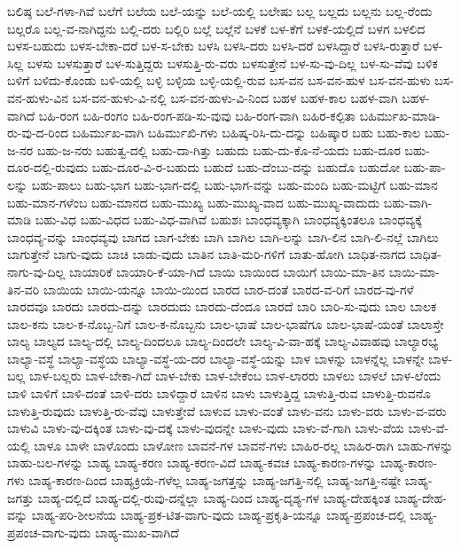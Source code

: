 {ಬಲಿಷ್ಠ
ಬಲೆ-ಗಳಾ-ಗಿವೆ
ಬಲೆಗೆ
ಬಲೆಯ
ಬಲೆ-ಯನ್ನು
ಬಲೆ-ಯಲ್ಲಿ
ಬಲೇಷು
ಬಲ್ಲ
ಬಲ್ಲದು
ಬಲ್ಲನು
ಬಲ್ಲ-ರೆಂದು
ಬಲ್ಲರೊ
ಬಲ್ಲ-ವ-ನಾಗಿದ್ದನು
ಬಲ್ಲಿ-ದರು
ಬಲ್ಲಿರಿ
ಬಲ್ಲೆ
ಬಲ್ಲೆನೆ
ಬಳಕೆ
ಬಳ-ಕೆಗೆ
ಬಳಕೆ-ಯಲ್ಲಿದೆ
ಬಳಗ
ಬಳಲಿದ
ಬಳಸ-ಬಹುದು
ಬಳಸ-ಬೇಕಾ-ದರೆ
ಬಳ-ಸ-ಬೇಕು
ಬಳಸಿ
ಬಳಸಿ-ದರು
ಬಳಸಿ-ದರೆ
ಬಳಸಿದ್ದಾರೆ
ಬಳಸಿ-ರುತ್ತಾರೆ
ಬಳ-ಸಿಲ್ಲ
ಬಳಸು
ಬಳಸುತ್ತಾರೆ
ಬಳ-ಸುತ್ತಿದ್ದರು
ಬಳಸುತ್ತಿ-ರು-ವರು
ಬಳಸುತ್ತೇನೆ
ಬಳ-ಸು-ವು-ದಿಲ್ಲ
ಬಳ-ಸು-ವೆವು
ಬಳಿಕ
ಬಳಿಗೆ
ಬಳಿದು-ಕೊಂಡು
ಬಳಿ-ಯಲ್ಲಿ
ಬಳ್ಳಿ
ಬಳ್ಳಿಯ
ಬಳ್ಳಿ-ಯಲ್ಲಿ-ರುವ
ಬಸ-ವನ
ಬಸ-ವನ-ಹುಳ
ಬಸ-ವನ-ಹುಳು
ಬಸ-ವನ-ಹುಳು-ವಿನ
ಬಸ-ವನ-ಹುಳು-ವಿ-ನಲ್ಲಿ
ಬಸ-ವನ-ಹುಳು-ವಿ-ನಿಂದ
ಬಹಳ
ಬಹಳ-ಕಾಲ
ಬಹಳ-ವಾಗಿ
ಬಹಳ-ವಾಗಿದೆ
ಬಹಿ-ರಂಗ
ಬಹಿ-ರಂಗಂ
ಬಹಿ-ರಂಗ-ಪಡಿ-ಸು-ವುವು
ಬಹಿ-ರಂಗ-ವಾಗಿ
ಬಹಿರ-ಕಲ್ಪಿತಾ
ಬಹಿರ್ಮುಖ-ಮಾಡಿ-ರು-ವು-ದ-ರಿಂದ
ಬಹಿರ್ಮುಖ-ವಾಗಿ
ಬಹಿರ್ಮುಖಿ-ಗಳು
ಬಹಿಷ್ಕ-ರಿಸಿ-ದು-ದನ್ನು
ಬಹಿಷ್ಕಾರ
ಬಹು
ಬಹು-ಕಾಲ
ಬಹು-ಜ-ನರ
ಬಹು-ಜ-ನರು
ಬಹುತ್ವ-ದಲ್ಲಿ
ಬಹು-ದಾ-ಗಿತ್ತು
ಬಹುದು
ಬಹು-ದು-ಕೊ-ನೆ-ಯದು
ಬಹು-ದೂರ
ಬಹು-ದೂರ-ದಲ್ಲಿ-ರುವುದು
ಬಹು-ದೂರ-ವಿ-ರ-ಬಹುದು
ಬಹುದೆ
ಬಹು-ದೆಂಬು-ದನ್ನು
ಬಹುದೊ
ಬಹುದೋ
ಬಹು-ಪಾ-ಲನ್ನು
ಬಹು-ಪಾಲು
ಬಹು-ಭಾಗ
ಬಹು-ಭಾಗ-ದಲ್ಲಿ
ಬಹು-ಭಾಗ-ವನ್ನು
ಬಹು-ಮಂದಿ
ಬಹು-ಮಟ್ಟಿಗೆ
ಬಹು-ಮಾನ
ಬಹು-ಮಾನ-ಗಳೆಂಬ
ಬಹು-ಮಾನದ
ಬಹು-ಮುಖ್ಯ
ಬಹು-ಮುಖ್ಯ-ವಾದ
ಬಹು-ಮುಖ್ಯ-ವಾದುದು
ಬಹು-ವಾಗಿ-ಮಾಡಿ
ಬಹು-ವಿಧ
ಬಹು-ವಿಧದ
ಬಹು-ವಿಧ-ವಾಗಿವೆ
ಬಹುಶಃ
ಬಾಂಧವ್ಯಕ್ಕಾಗಿ
ಬಾಂಧವ್ಯಕ್ಕಿಂತಲೂ
ಬಾಂಧವ್ಯಕ್ಕೆ
ಬಾಂಧವ್ಯ-ವನ್ನು
ಬಾಂಧವ್ಯವು
ಬಾಗದ
ಬಾಗ-ಬೇಕು
ಬಾಗಿ
ಬಾಗಿಲ
ಬಾಗಿ-ಲನ್ನು
ಬಾಗಿ-ಲಿನ
ಬಾಗಿ-ಲಿ-ನಲ್ಲೆ
ಬಾಗಿಲು
ಬಾಗುತ್ತೇನೆ
ಬಾಗು-ವುದು
ಬಾಚಿ
ಬಾಡು-ವುದು
ಬಾತಿನ
ಬಾತಿ-ಮರಿ-ಗಳಿಗೆ
ಬಾತು-ಹೋಗಿ
ಬಾಧಿತ-ನಾಗದ
ಬಾಧಿತ-ನಾಗು-ವು-ದಿಲ್ಲ
ಬಾಯಾರಿಕೆ
ಬಾಯಾರಿ-ಕೆ-ಯಾ-ಗಿದೆ
ಬಾಯಿ
ಬಾಯಿಂದ
ಬಾಯಿಗೆ
ಬಾಯಿ-ಮಾ-ತಿನ
ಬಾಯಿ-ಮಾ-ತಿನ-ವರಿ
ಬಾಯಿಯ
ಬಾಯಿ-ಯನ್ನೂ
ಬಾಯಿ-ಯಿಂದ
ಬಾರದ
ಬಾರ-ದಂತೆ
ಬಾರದ-ವ-ರಿಗೆ
ಬಾರದ-ವು-ಗಳೆ
ಬಾರದವೂ
ಬಾರದು
ಬಾರದು-ದನ್ನು
ಬಾರದುದು
ಬಾರದು-ದೆಂದೂ
ಬಾರದೆ
ಬಾರಿ
ಬಾರಿ-ಸು-ವುದು
ಬಾಲ
ಬಾಲಕ
ಬಾಲ-ಕನು
ಬಾಲ-ಕ-ನೊಬ್ಬ-ನಿಗೆ
ಬಾಲ-ಕ-ನೊಬ್ಬನು
ಬಾಲ-ಭಾಷೆ
ಬಾಲ-ಭಾಷೆಗೂ
ಬಾಲ-ಭಾಷೆ-ಯಂತೆ
ಬಾಲಾಸ್ತೇ
ಬಾಲ್ಯ
ಬಾಲ್ಯದ
ಬಾಲ್ಯ-ದಲ್ಲಿ
ಬಾಲ್ಯ-ದಿಂದಲೂ
ಬಾಲ್ಯ-ದಿಂದಲೇ
ಬಾಲ್ಯ-ವಿ-ವಾ-ಹಕ್ಕೆ
ಬಾಲ್ಯ-ವಿವಾಹವು
ಬಾಲ್ಯಾರಭ್ಯ
ಬಾಲ್ಯಾ-ವಸ್ಥೆ
ಬಾಲ್ಯಾ-ವಸ್ಥೆಯ
ಬಾಲ್ಯಾ-ವಸ್ಥೆ-ಯ-ದರ
ಬಾಲ್ಯಾ-ವಸ್ಥೆ-ಯನ್ನು
ಬಾಳ
ಬಾಳನ್ನು
ಬಾಳನ್ನೆಲ್ಲ
ಬಾಳನ್ನೇ
ಬಾಳ-ಬಲ್ಲ
ಬಾಳ-ಬಲ್ಲರು
ಬಾಳ-ಬೇಕಾ-ಗಿದೆ
ಬಾಳ-ಬೇಕು
ಬಾಳ-ಬೇಕೆಂಬ
ಬಾಳ-ಲಾರರು
ಬಾಳಲು
ಬಾಳಲೆ
ಬಾಳ-ಲೆಂದು
ಬಾಳಿ
ಬಾಳಿಗೆ
ಬಾಳಿ-ದಂತೆ
ಬಾಳಿ-ದರು
ಬಾಳಿದ್ದಾರೆ
ಬಾಳಿನ
ಬಾಳು
ಬಾಳುತ್ತಿದ್ದ
ಬಾಳುತ್ತಿ-ರುವ
ಬಾಳುತ್ತಿ-ರುವನೊ
ಬಾಳುತ್ತಿ-ರುವುದು
ಬಾಳುತ್ತಿ-ರು-ವೆವು
ಬಾಳುತ್ತೇವೆ
ಬಾಳುವ
ಬಾಳು-ವಂತೆ
ಬಾಳು-ವನು
ಬಾಳು-ವರು
ಬಾಳು-ವ-ವರು
ಬಾಳುವಿ
ಬಾಳು-ವು-ದಕ್ಕಿಂತ
ಬಾಳು-ವು-ದಕ್ಕೆ
ಬಾಳು-ವುದನ್ನೇ
ಬಾಳು-ವುದು
ಬಾಳು-ವೆ-ಗಾಗಿ
ಬಾಳು-ವೆಯ
ಬಾಳು-ವೆ-ಯಲ್ಲಿ
ಬಾಳೂ
ಬಾಳೇ
ಬಾಳೊಂದು
ಬಾಳೋಣ
ಬಾವನೆ-ಗಳ
ಬಾವನೆ-ಗಳು
ಬಾಹಿರ-ರಲ್ಲ
ಬಾಹಿರ-ರಾಗಿ
ಬಾಹು-ಗಳನ್ನು
ಬಾಹು-ಬಲ-ಗಳನ್ನು
ಬಾಹ್ಯ
ಬಾಹ್ಯ-ಕರಣ
ಬಾಹ್ಯ-ಕರಣ-ವಿದೆ
ಬಾಹ್ಯ-ಕವಚ
ಬಾಹ್ಯ-ಕಾರಣ-ಗಳನ್ನು
ಬಾಹ್ಯ-ಕಾರಣ-ಗಳು
ಬಾಹ್ಯ-ಕಾರಣ-ದಿಂದ
ಬಾಹ್ಯಕ್ರಿಯೆ-ಗಳೆಲ್ಲ
ಬಾಹ್ಯ-ಜಗತ್ತನ್ನು
ಬಾಹ್ಯ-ಜಗತ್ತಿ-ನಲ್ಲಿ
ಬಾಹ್ಯ-ಜಗತ್ತಿ-ನಷ್ಟೇ
ಬಾಹ್ಯ-ಜಗತ್ತು
ಬಾಹ್ಯ-ದಲ್ಲಿದೆ
ಬಾಹ್ಯ-ದಲ್ಲಿ-ರುವು-ದನ್ನೆಲ್ಲಾ
ಬಾಹ್ಯ-ದಿಂದ
ಬಾಹ್ಯ-ದೃಶ್ಯ-ಗಳ
ಬಾಹ್ಯ-ದೇಹಕ್ಕಿಂತ
ಬಾಹ್ಯ-ದೇಹ-ವನ್ನು
ಬಾಹ್ಯ-ಪರಿ-ಶೀಲನೆಯ
ಬಾಹ್ಯ-ಪ್ರಕ-ಟಿತ-ವಾಗು-ವುದು
ಬಾಹ್ಯ-ಪ್ರಕೃತಿ-ಯನ್ನೂ
ಬಾಹ್ಯ-ಪ್ರಪಂಚ-ದಲ್ಲಿ
ಬಾಹ್ಯ-ಪ್ರಪಂಚ-ವಾಗು-ವುದು
ಬಾಹ್ಯ-ಮುಖ-ವಾಗಿದೆ
}
